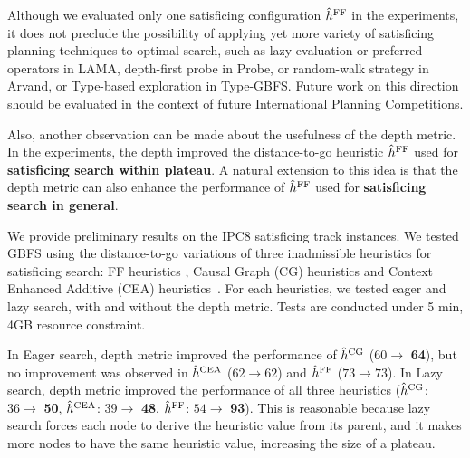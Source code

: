 Although we evaluated only one \sota satisficing configuration $\hat{h}^{\text{FF}}$ in
the experiments, it does not preclude the possibility of applying yet
more variety of satisficing planning techniques to optimal search, such as lazy-evaluation
or preferred operators in LAMA, depth-first probe in Probe, or
random-walk strategy in Arvand, or Type-based exploration in Type-GBFS.
Future work on this direction should be evaluated in the context of
future International Planning Competitions.

Also, another observation can be made about the usefulness of the depth metric.
In the experiments, the depth improved the distance-to-go \ff heuristic $\hat{h}^{\text{FF}}$
used for \textbf{satisficing search within plateau}. A natural extension
to this idea is that the depth metric can also enhance the performance of
$\hat{h}^{\text{FF}}$ used for \textbf{satisficing search in general}.

We provide preliminary results on the IPC8 satisficing track
instances. We tested GBFS using the distance-to-go variations of three
\sota inadmissible heuristics for satisficing search: FF heuristics
 \cite{Hoffmann01}, Causal Graph (CG) heuristics \cite{Helmert2006} and
Context Enhanced Additive (CEA) heuristics\ \cite{helmert2008unifying}.
For each heuristics, we tested eager and lazy search, with and without
the depth metric.  Tests are conducted under 5 min, 4GB
resource constraint.

In Eager search, depth metric
improved the performance of $\hat{h}^{\text{CG}}$ ($60\rightarrow $ \textbf{64}), but no
improvement was observed in $\hat{h}^{\text{CEA}}$ ($62\rightarrow 62$)
and $\hat{h}^{\text{FF}}$ ($73\rightarrow 73$). In Lazy search, depth metric
improved the performance of all three heuristics
($\hat{h}^{\text{CG}}$: $36\rightarrow $ \textbf{50}, 
 $\hat{h}^{\text{CEA}}$: $39\rightarrow $ \textbf{48}, 
 $\hat{h}^{\text{FF}}$: $54\rightarrow $ \textbf{93}). This is reasonable
because lazy search forces each node to derive the heuristic value from
its parent, and it makes more nodes to have the same heuristic value,
increasing the size of a plateau.

%  


